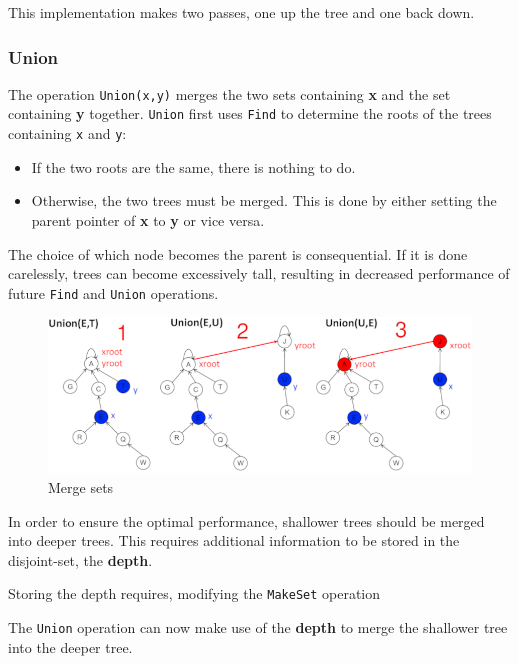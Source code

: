 \documentclass[
]{book}
\providecommand{\tightlist}{%
  \setlength{\itemsep}{0pt}\setlength{\parskip}{0pt}}
\begin{document}
This implementation makes two passes, one up the tree and one back down.

\hypertarget{union}{%
\subsubsection{Union}\label{union}}

The operation \texttt{Union(x,y)} merges the two sets containing \textbf{x} and the set containing \textbf{y} together. \texttt{Union} first uses \texttt{Find} to determine the roots of the trees containing \texttt{x} and \texttt{y}:

\begin{itemize}
\tightlist
\item
  If the two roots are the same, there is nothing to do.
\item
  Otherwise, the two trees must be merged. This is done by either setting the parent pointer of \textbf{x} to \textbf{y} or vice versa.
\end{itemize}

The choice of which node becomes the parent is consequential. If it is done carelessly, trees can become excessively tall, resulting in decreased performance of future \texttt{Find} and \texttt{Union} operations.

\begin{figure}

{\centering \includegraphics{img/07-image06} 

}

\caption{Merge sets}\label{fig:union}
\end{figure}

In order to ensure the optimal performance, {shallower trees should be merged into deeper trees}. This requires additional information to be stored in the disjoint-set, the \textbf{depth}.

Storing the depth requires, modifying the \texttt{MakeSet} operation

The \texttt{Union} operation can now make use of the \textbf{depth} to merge the shallower tree into the deeper tree.
\end{document}
